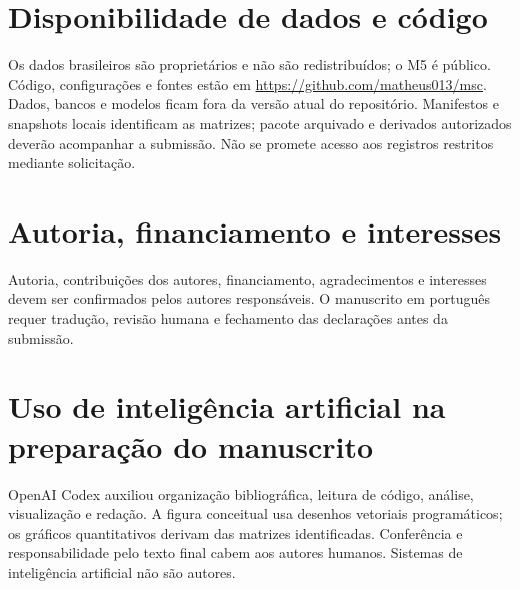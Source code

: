 \documentclass[preprint,12pt]{elsarticle}
\begin{document}
\section*{Disponibilidade de dados e código}
Os dados brasileiros são proprietários e não são redistribuídos; o M5 é público. Código, configurações e fontes estão em \url{https://github.com/matheus013/msc}. Dados, bancos e modelos ficam fora da versão atual do repositório. Manifestos e snapshots locais identificam as matrizes; pacote arquivado e derivados autorizados deverão acompanhar a submissão. Não se promete acesso aos registros restritos mediante solicitação.

\section*{Autoria, financiamento e interesses}
Autoria, contribuições dos autores, financiamento, agradecimentos e interesses devem ser confirmados pelos autores responsáveis. O manuscrito em português requer tradução, revisão humana e fechamento das declarações antes da submissão.

\section*{Uso de inteligência artificial na preparação do manuscrito}
OpenAI Codex auxiliou organização bibliográfica, leitura de código, análise, visualização e redação. A figura conceitual usa desenhos vetoriais programáticos; os gráficos quantitativos derivam das matrizes identificadas. Conferência e responsabilidade pelo texto final cabem aos autores humanos. Sistemas de inteligência artificial não são autores.



\end{document}
